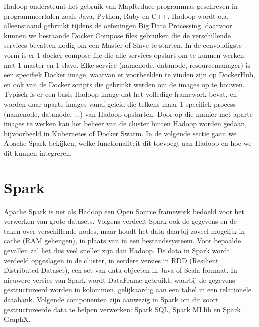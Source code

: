 Hadoop ondersteunt het gebruik van MapReduce programmas geschreven in programmeertalen zoals Java, Python, Ruby en C++.
\autocite{Taylor2023}
\newline
\newline
Hadoop wordt o.a. alleenstaand gebruikt tijdens de oefeningen Big Data Processing, daarvoor kunnen we bestaande Docker Compose files gebruiken die de verschillende services bevatten nodig om een Master of Slave te starten.
In de eenvoudigste vorm is er 1 docker compose file die alle services opstart om te kunnen werken met 1 master en 1 slave.
\newline
\newline
Elke service (namenode, datanode, resourcemanager) is een specifiek Docker image, waarvan er voorbeelden te vinden zijn op DockerHub, en ook van de Docker scripts die gebruikt werden om de images op te bouwen. Typisch is er een basis Hadoop image dat het volledige framework bevat, en worden daar aparte images vanaf geleid die telkens maar 1 specifiek process (namenode, datanode, ...) van Hadoop opstarten.
\newline
Door op die manier met aparte images te werken kan het beheer van de cluster buiten Hadoop worden gedaan, bijvoorbeeld in Kubernetes of Docker Swarm.
\newline
\newline
In de volgende sectie gaan we Apache Spark bekijken, welke functionaliteit dit toevoegt aan Hadoop en hoe we dit kunnen integreren.
\newline
\newline

\section{Spark}
Apache Spark is net als Hadoop een Open Source framework bedoeld voor het verwerken van grote datasets. Volgens \textcite{AwsAmazon2023a} verdeelt Spark ook de gegevens en de taken over verschillende nodes, maar houdt het data daarbij zoveel mogelijk in cache (RAM geheugen), in plaats van in een bestandssysteem. Voor bepaalde gevallen zal het dus veel sneller zijn dan Hadoop.
\newline
\newline
De data in Spark wordt verdeeld opgeslagen in de cluster, in eerdere versies in RDD (Resilient Distributed Dataset), een set van data objecten in Java of Scala formaat. In nieuwere versies van Spark wordt DataFrame gebruikt, waarbij de gegevens gestructureerd worden in kolommen, gelijkaardig aan een tabel in een relationele databank. Volgende componenten zijn aanwezig in Spark om dit soort gestructureerde data te helpen verwerken: Spark SQL, Spark MLlib en Spark GraphX.
\autocite{DataFlair2023}
\newline
\newline

